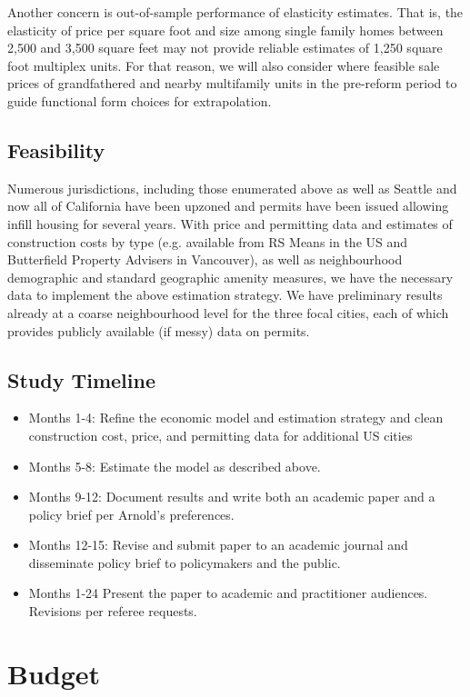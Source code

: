 \documentclass[12pt]{article}
\begin{document}
Another concern is out-of-sample performance of elasticity estimates. That is, the elasticity of price per square foot and size among single family homes between 2,500 and 3,500 square feet may not provide reliable estimates of 1,250 square foot multiplex units. For that reason, we will also consider where feasible sale prices of grandfathered and nearby multifamily units in the pre-reform period to guide functional form choices for extrapolation.

\subsection{Feasibility}

Numerous jurisdictions, including those enumerated above as well as Seattle and now all of California have been upzoned and permits have been issued allowing infill housing for several years. With price and permitting data and estimates of construction costs by type (e.g. available from RS Means in the US and Butterfield Property Advisers in Vancouver), as well as neighbourhood demographic and standard geographic amenity measures, we have the necessary data to implement the above estimation strategy. We have preliminary results already at a coarse neighbourhood level for the three focal cities, each of which provides publicly available (if messy) data on permits.

\subsection{Study Timeline}

\begin{itemize}
	\item Months 1-4: Refine the economic model and estimation strategy and clean construction cost, price, and permitting data for additional US cities
	\item Months 5-8: Estimate the model as described above.
	\item Months 9-12: Document results and write both an academic paper and a policy brief per Arnold's preferences.
	\item Months 12-15: Revise and submit paper to an academic journal and disseminate policy brief to policymakers and the public.
	\item Months 1-24 Present the paper to academic and practitioner audiences. Revisions per referee requests.
\end{itemize}

\section{Budget}
\end{document}
